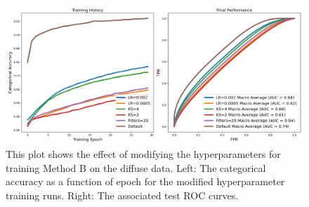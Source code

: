 \begin{table}[t]
    \centering
    \caption{Classification rates (the number of classifications per second) based on testing against $\sim$100,000 events for each method using 4 telescopes. Note that due to the LSTM features in our network this is substantially slower than classifications can be performed for Mono-telescope analysis ($\sim$1 kHz). This is also dependent on the GPU used (a NVidia 1080Ti in this case), and the data loader has not been fully optimised for speed. The test system had 32GB of Random Access Memory and operated at a clock speed of 1866 MHz.}
    \label{table:speed}
\end{table}
 \begin{figure}[t]
  \centering
  \includegraphics[width=\textwidth]{figures/modhyp.png}
  \caption{This plot shows the effect of modifying the hyperparameters for training Method B on the diffuse data. Left: The categorical accuracy as a function of epoch for the modified hyperparameter training runs. Right: The associated test ROC curves.
  }
  \label{fig:modhyp}
\end{figure}
